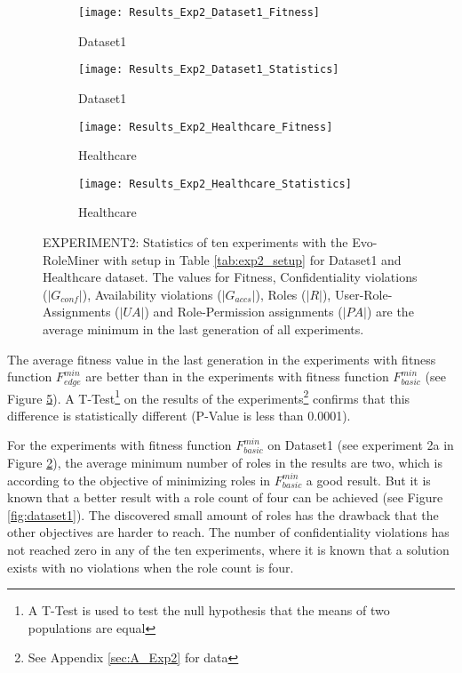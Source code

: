 \begin{figure}[H]
	\centering
	\begin{subfigure}{0.45\textwidth}
		\texttt{[image: Results\_Exp2\_Dataset1\_Fitness]}
		\caption{Dataset1}
		\label{fig:Results_Exp2_Dataset1_Fitness}
	\end{subfigure}%
	\begin{subfigure}{0.55\textwidth}
		\centering
		\texttt{[image: Results\_Exp2\_Dataset1\_Statistics]}
		\caption{Dataset1}
		\label{fig:Results_Exp2_Dataset1_Statistics}
	\end{subfigure}
	\begin{subfigure}{0.45\textwidth}
		\texttt{[image: Results\_Exp2\_Healthcare\_Fitness]}
		\caption{Healthcare}
		\label{fig:Results_Exp2_Healthcare_Fitness}
	\end{subfigure}%
	\begin{subfigure}{0.55\textwidth}
		\centering
		\texttt{[image: Results\_Exp2\_Healthcare\_Statistics]}
		\caption{Healthcare}
		\label{fig:Results_Exp2_Healthcare_Statistics}
	\end{subfigure}
	\caption{EXPERIMENT2: Statistics of ten experiments with the Evo-RoleMiner with setup in Table \ref{tab:exp2_setup} for Dataset1 and Healthcare dataset. The values for Fitness, Confidentiality violations ($|G_{conf}|$), Availability violations ($|G_{accs}|$), Roles ($|R|$), User-Role-Assignments ($|UA|$) and Role-Permission assignments ($|PA|$) are the average minimum in the last generation of all experiments.}
	\label{fig:Results_Exp2}
\end{figure}

The average fitness value in the last generation in the experiments with fitness function $F_{edge}^{min}$ are better than in the experiments with fitness function $F_{basic}^{min}$ (see Figure \ref{fig:Results_Exp2}). A T-Test\footnote{A T-Test is used to test the null hypothesis that the means of two populations are equal} on the results of the experiments\footnote{See Appendix \ref{sec:A_Exp2} for data} confirms that this difference is statistically different (P-Value is less than 0.0001).

For the experiments with fitness function $F_{basic}^{min}$ on Dataset1 (see experiment 2a in Figure \ref{fig:Results_Exp2_Dataset1_Statistics}), the average minimum number of roles in the results are two, which is according to the objective of minimizing roles in $F_{basic}^{min}$ a good result. But it is known that a better result with a role count of four can be achieved (see Figure \ref{fig:dataset1}). The discovered small amount of roles has the drawback that the other objectives are harder to reach. The number of confidentiality violations has not reached zero in any of the ten experiments, where it is known that a solution exists with no violations when the role count is four.

